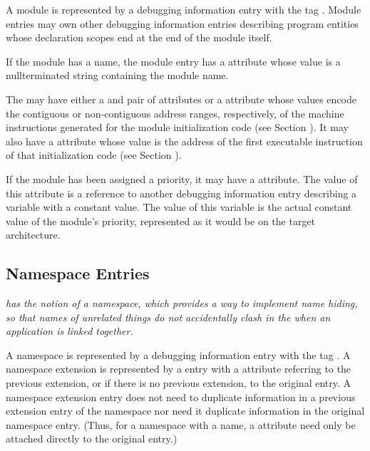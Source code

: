 A module is represented by a debugging information entry
with the 
tag \DWTAGmoduleTARG.  
Module entries may own other
debugging information entries describing program entities
whose declaration scopes end at the end of the module itself.

If the module has a name, the module entry has a 
\DWATname{} attribute 
whose value is a null\dash terminated string containing
the module name.

The  may have either a 
\DWATlowpc{} and
\DWAThighpc{} 
pair 
of 
attributes or a 
\DWATranges{} attribute
whose values encode the contiguous or non-contiguous address
ranges, respectively, of the machine instructions generated for
the module initialization
code\hypertarget{chap:DWATentrypcentryaddressofmoduleinitialization}{} 
(see Section ). 
It may also have a
\DWATentrypc{} attribute whose value is the address of
the first executable instruction of that initialization code
(see Section ).

If\hypertarget{chap:DWATprioritymodulepriority}{}
the module has been assigned a priority, it may have a
\DWATpriorityDEFN{} attribute. 
The value of this attribute is a
reference to another debugging information entry describing
a variable with a constant value. The value of this variable
is the actual constant value of the module\textquoteright{s} priority,
represented as it would be on the target architecture.

\subsection{Namespace Entries}
\label{chap:namespaceentries}
\textit{ has the notion of a namespace, which provides a way to
implement name hiding, so that names of unrelated things
do not accidentally clash in the 
 when an
application is linked together.}

A namespace is represented by a debugging information entry
with the tag \DWTAGnamespaceTARG. A namespace extension 
is\hypertarget{chap:DWATextensionpreviousnamespaceextensionororiginalnamespace}{}
represented by a \DWTAGnamespaceNAME{} entry with a 
\DWATextensionDEFN{}
attribute referring to the previous extension, or if there
is no previous extension, to the original 
\DWTAGnamespaceNAME{}
entry. A namespace extension entry does not need to duplicate
information in a previous extension entry of the namespace
nor need it duplicate information in the original namespace
entry. (Thus, for a namespace with a name, 
a \DWATname{} attribute 
need only be attached directly to the original
\DWTAGnamespaceNAME{} entry.)

